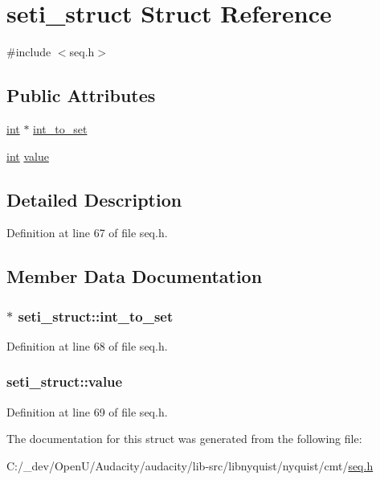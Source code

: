 \hypertarget{structseti__struct}{}\section{seti\+\_\+struct Struct Reference}
\label{structseti__struct}


{\ttfamily \#include $<$seq.\+h$>$}

\subsection*{Public Attributes}
\begin{DoxyCompactItemize}
\item 
\hyperlink{xmltok_8h_a5a0d4a5641ce434f1d23533f2b2e6653}{int} $\ast$ \hyperlink{structseti__struct_a3c2706f1268d298970d83490b1db9e69}{int\+\_\+to\+\_\+set}
\item 
\hyperlink{xmltok_8h_a5a0d4a5641ce434f1d23533f2b2e6653}{int} \hyperlink{structseti__struct_ac409612ea9196f885cead4486f71a1b0}{value}
\end{DoxyCompactItemize}


\subsection{Detailed Description}


Definition at line 67 of file seq.\+h.



\subsection{Member Data Documentation}
\subsubsection[{\texorpdfstring{int\+\_\+to\+\_\+set}{int_to_set}}]{$\ast$ seti\+\_\+struct\+::int\+\_\+to\+\_\+set}\hypertarget{structseti__struct_a3c2706f1268d298970d83490b1db9e69}{}\label{structseti__struct_a3c2706f1268d298970d83490b1db9e69}


Definition at line 68 of file seq.\+h.

\subsubsection[{\texorpdfstring{value}{value}}]{ seti\+\_\+struct\+::value}\hypertarget{structseti__struct_ac409612ea9196f885cead4486f71a1b0}{}\label{structseti__struct_ac409612ea9196f885cead4486f71a1b0}


Definition at line 69 of file seq.\+h.



The documentation for this struct was generated from the following file\+:\begin{DoxyCompactItemize}
\item 
C\+:/\+\_\+dev/\+Open\+U/\+Audacity/audacity/lib-\/src/libnyquist/nyquist/cmt/\hyperlink{seq_8h}{seq.\+h}\end{DoxyCompactItemize}
